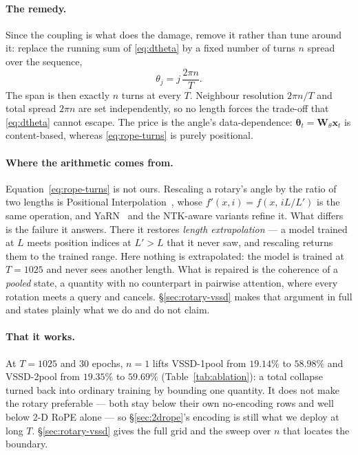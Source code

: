\documentclass[11pt,a4paper]{article}
\begin{document}
\paragraph{The remedy.}
Since the coupling is what does the damage, remove it rather than tune around it: replace
the running sum of \eqref{eq:dtheta} by a fixed number of turns $n$ spread over the
sequence,
\begin{equation}
  \theta_j = j\,\frac{2\pi n}{T} .
  \label{eq:rope-turns}
\end{equation}
The span is then exactly $n$ turns at every $T$. Neighbour resolution $2\pi n/T$ and total
spread $2\pi n$ are set independently, so no length forces the trade-off that
\eqref{eq:dtheta} cannot escape. The price is the angle's data-dependence:
$\bm{\theta}_t=\bm{W}_\theta\bm{x}_t$ is content-based, whereas \eqref{eq:rope-turns} is
purely positional.

\paragraph{Where the arithmetic comes from.}
Equation~\eqref{eq:rope-turns} is not ours. Rescaling a rotary's angle by the ratio of two
lengths is Positional Interpolation~\cite{posinterp}, whose $f'(x,i)=f(x,\,iL/L')$ is the
same operation, and YaRN~\cite{yarn} and the NTK-aware variants refine it. What differs is
the failure it answers. There it restores \emph{length extrapolation} --- a model trained
at $L$ meets position indices at $L'>L$ that it never saw, and rescaling returns them to
the trained range. Here nothing is extrapolated: the model is trained at $T{=}1025$ and
never sees another length. What is repaired is the coherence of a \emph{pooled} state, a
quantity with no counterpart in pairwise attention, where every rotation meets a query and
cancels. \S\ref{sec:rotary-vssd} makes that argument in full and states plainly what we do
and do not claim.

\paragraph{That it works.}
At $T{=}1025$ and $30$ epochs, $n{=}1$ lifts VSSD-1pool from $19.14\%$ to $58.98\%$ and
VSSD-2pool from $19.35\%$ to $59.69\%$ (Table~\ref{tab:ablation}): a total
collapse turned back into ordinary training by bounding one quantity. It does not make the
rotary preferable --- both stay below their own no-encoding rows and well below 2-D RoPE
alone --- so \S\ref{sec:2drope}'s encoding is still what we deploy at long $T$.
\S\ref{sec:rotary-vssd} gives the full grid and the sweep over $n$ that locates the
boundary.
\end{document}
